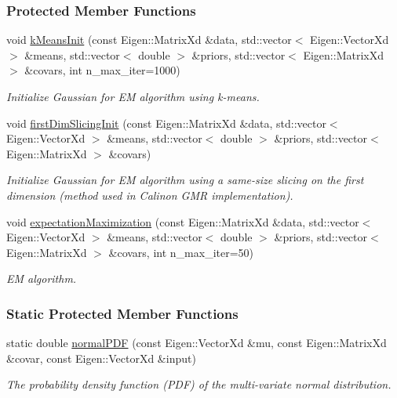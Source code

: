 \subsubsection*{Protected Member Functions}
\begin{DoxyCompactItemize}
\item 
void \hyperlink{classDmpBbo_1_1FunctionApproximatorGMR_af9a5e39e32c14b1daa7aa5ecfe1a5bfb}{k\+Means\+Init} (const Eigen\+::\+Matrix\+Xd \&data, std\+::vector$<$ Eigen\+::\+Vector\+Xd $>$ \&means, std\+::vector$<$ double $>$ \&priors, std\+::vector$<$ Eigen\+::\+Matrix\+Xd $>$ \&covars, int n\+\_\+max\+\_\+iter=1000)
\begin{DoxyCompactList}\small\item\em Initialize Gaussian for E\+M algorithm using k-\/means. \end{DoxyCompactList}\item 
void \hyperlink{classDmpBbo_1_1FunctionApproximatorGMR_ab99de8c0d7c1870958e63f1bfc198303}{first\+Dim\+Slicing\+Init} (const Eigen\+::\+Matrix\+Xd \&data, std\+::vector$<$ Eigen\+::\+Vector\+Xd $>$ \&means, std\+::vector$<$ double $>$ \&priors, std\+::vector$<$ Eigen\+::\+Matrix\+Xd $>$ \&covars)
\begin{DoxyCompactList}\small\item\em Initialize Gaussian for E\+M algorithm using a same-\/size slicing on the first dimension (method used in Calinon G\+M\+R implementation). \end{DoxyCompactList}\item 
void \hyperlink{classDmpBbo_1_1FunctionApproximatorGMR_a78aab3aea2aa82ceadde61d4ca168a64}{expectation\+Maximization} (const Eigen\+::\+Matrix\+Xd \&data, std\+::vector$<$ Eigen\+::\+Vector\+Xd $>$ \&means, std\+::vector$<$ double $>$ \&priors, std\+::vector$<$ Eigen\+::\+Matrix\+Xd $>$ \&covars, int n\+\_\+max\+\_\+iter=50)
\begin{DoxyCompactList}\small\item\em E\+M algorithm. \end{DoxyCompactList}\end{DoxyCompactItemize}
\subsubsection*{Static Protected Member Functions}
\begin{DoxyCompactItemize}
\item 
static double \hyperlink{classDmpBbo_1_1FunctionApproximatorGMR_a68ed18ca86526a591014123290dc855a}{normal\+P\+D\+F} (const Eigen\+::\+Vector\+Xd \&mu, const Eigen\+::\+Matrix\+Xd \&covar, const Eigen\+::\+Vector\+Xd \&input)
\begin{DoxyCompactList}\small\item\em The probability density function (P\+D\+F) of the multi-\/variate normal distribution. \end{DoxyCompactList}\end{DoxyCompactItemize}
